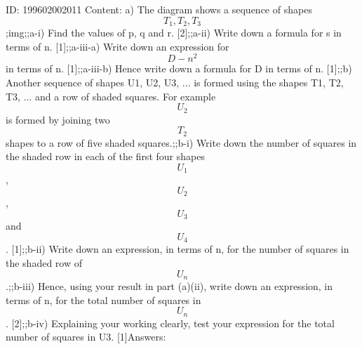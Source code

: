 \documentclass{article}
\begin{document}
ID: 199602002011
Content:
a) The diagram shows a sequence of shapes $$T_1, T_2, T_3$$;img;;a-i) Find the values of p, q and r. [2];;a-ii) Write down a formula for s in terms of n. [1];;a-iii-a) Write down an expression for $$D - n^2$$ in terms of n. [1];;a-iii-b) Hence write down a formula for D in terms of n. [1];;b) Another sequence of shapes U1, U2, U3, ... is formed using the shapes T1, T2, T3, ... and a row of shaded squares. For example $$U_2$$ is formed by joining two $$T_2$$ shapes to a row of five shaded squares.;;b-i) Write down the number of squares in the shaded row in each of the first four shapes $$U_1$$,$$U_2$$, $$U_3$$ and $$U_4$$. [1];;b-ii) Write down an expression, in terms of n, for the number of squares in the shaded row of $$U_n$$.;;b-iii) Hence, using your result in part (a)(ii), write down an expression, in terms of n, for the total number of squares in $$U_n$$. [2];;b-iv) Explaining your working clearly, test your expression for the total number of squares in U3. [1]Answers:
\end{document}
